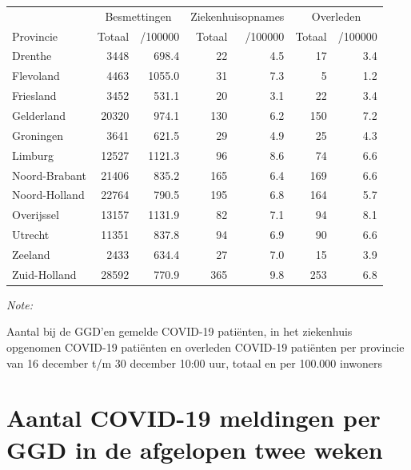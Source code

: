 \documentclass[
  english,
  man,floatsintext]{apa6}
\begin{document}
\begin{table}[H]
\centering
\begin{threeparttable}
\begin{tabular}{lrrrrrr}
\toprule
\multicolumn{1}{c}{ } & \multicolumn{2}{c}{Besmettingen} & \multicolumn{2}{c}{Ziekenhuisopnames} & \multicolumn{2}{c}{Overleden} \\
\cmidrule(l{3pt}r{3pt}){2-3} \cmidrule(l{3pt}r{3pt}){4-5} \cmidrule(l{3pt}r{3pt}){6-7}
Provincie & Totaal & /100000 & Totaal & /100000 & Totaal & /100000\\
\midrule
Drenthe & 3448 & 698.4 & 22 & 4.5 & 17 & 3.4\\
Flevoland & 4463 & 1055.0 & 31 & 7.3 & 5 & 1.2\\
Friesland & 3452 & 531.1 & 20 & 3.1 & 22 & 3.4\\
Gelderland & 20320 & 974.1 & 130 & 6.2 & 150 & 7.2\\
Groningen & 3641 & 621.5 & 29 & 4.9 & 25 & 4.3\\
Limburg & 12527 & 1121.3 & 96 & 8.6 & 74 & 6.6\\
Noord-Brabant & 21406 & 835.2 & 165 & 6.4 & 169 & 6.6\\
Noord-Holland & 22764 & 790.5 & 195 & 6.8 & 164 & 5.7\\
Overijssel & 13157 & 1131.9 & 82 & 7.1 & 94 & 8.1\\
Utrecht & 11351 & 837.8 & 94 & 6.9 & 90 & 6.6\\
Zeeland & 2433 & 634.4 & 27 & 7.0 & 15 & 3.9\\
Zuid-Holland & 28592 & 770.9 & 365 & 9.8 & 253 & 6.8\\
\bottomrule
\end{tabular}
\begin{tablenotes}
\item \textit{Note: } 
\item Aantal bij de GGD’en gemelde COVID-19 patiënten, in het ziekenhuis opgenomen COVID-19 patiënten en overleden COVID-19 patiënten per provincie van 16 december t/m 30 december 10:00 uur, totaal en per 100.000 inwoners
\end{tablenotes}
\end{threeparttable}
\end{table}

\newpage

\hypertarget{aantal-covid-19-meldingen-per-ggd-in-de-afgelopen-twee-weken}{%
\section{Aantal COVID-19 meldingen per GGD in de afgelopen twee weken}\label{aantal-covid-19-meldingen-per-ggd-in-de-afgelopen-twee-weken}}
\end{document}
